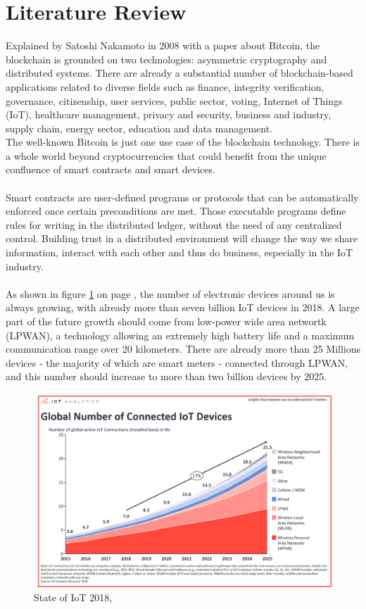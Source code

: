 \documentclass[11pt]{article}
\begin{document}
\section{Literature Review}
Explained by Satoshi Nakamoto in 2008 with a paper about Bitcoin, the blockchain is grounded on two technologies: asymmetric cryptography and distributed systems. There are already a substantial number of blockchain-based applications related to diverse fields such as finance, integrity verification, governance, citizenship, user services, public sector, voting, Internet of Things (IoT), healthcare management, privacy and security, business and industry, supply chain, energy sector, education and data management.\cite{1} \\
The well-known Bitcoin is just one use case of the blockchain technology. There is a whole world beyond cryptocurrencies that could benefit from the unique confluence of smart contracts and smart devices.\\\\
Smart contracts are user-defined programs or protocols that can be automatically enforced once certain preconditions are met. Those executable programs define rules for writing in the distributed ledger, without the need of any centralized control. Building trust in a distributed environment will change the way we share information, interact with each other and thus do business, especially in the IoT industry.\cite{2}\\\\
As shown in figure \ref{img_state} on page \pageref{img_state}, the number of electronic devices around us is always growing, with already more than seven billion IoT devices in 2018. A large part of the future growth should come from low-power wide area networtk (LPWAN), a technology allowing an extremely high battery life and a maximum communication range over 20 kilometers. There are already more than 25 Millions devices - the majority of which are smart meters - connected through LPWAN, and this number should increase to more than two billion devices by 2025.\\

\begin{figure}[H]
	\begin{center}
		\includegraphics[scale=0.275]{stateofIoT2018.png}
		\caption{State of IoT 2018, \cite{3}}
		\label{img_state}
	\end{center}
\end{figure}
\end{document}
